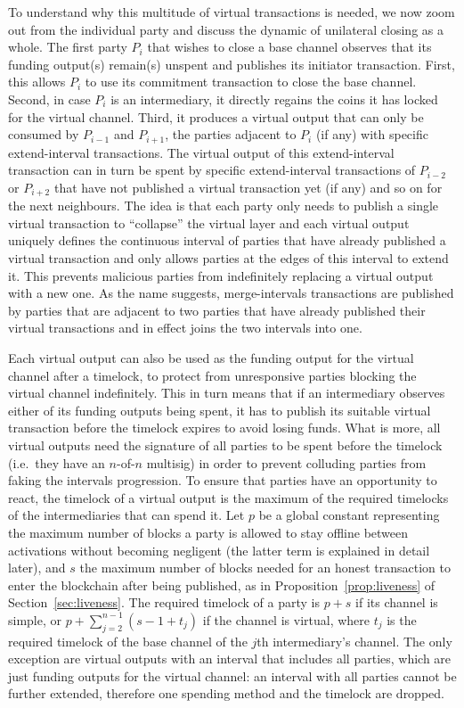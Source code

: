   To understand why this multitude of virtual transactions is needed, we now
  zoom out from the individual party and discuss the dynamic of unilateral
  closing as a
  whole. The first party $P_i$ that wishes to close a base channel observes that
  its funding output(s) remain(s) unspent and publishes its initiator
  transaction. First, this allows $P_i$ to use its commitment transaction to
  close the base channel. Second, in case $P_i$ is an intermediary, it directly
  regains the coins it has locked for the virtual channel. Third, it produces a
  virtual output that can only be consumed by $P_{i-1}$ and $P_{i+1}$, the
  parties adjacent to $P_i$ (if any) with specific extend-interval transactions.
  The virtual output of this extend-interval transaction can in turn be spent by
  specific extend-interval transactions of $P_{i-2}$ or $P_{i+2}$ that have not
  published a virtual transaction yet (if any) and so on for the next neighbours. The
  idea is that each party only needs to publish a single virtual transaction to
  ``collapse'' the virtual layer and each virtual output uniquely defines the
  continuous interval of parties that have already published a virtual
  transaction and only allows parties at the edges of this interval to extend it.
  This prevents malicious parties from indefinitely replacing a virtual output
  with a new one. As the name suggests, merge-intervals transactions are
  published by parties that are adjacent to two parties that have already
  published their virtual transactions and in effect joins the two intervals into
  one.

  Each virtual output can also be used as the funding output for the virtual
  channel after a timelock, to protect from unresponsive parties blocking the
  virtual channel indefinitely. This in turn means that if an intermediary
  observes either of its funding outputs being spent, it has to publish its
  suitable virtual transaction before the timelock expires to avoid losing
  funds. What is more, all virtual outputs need the signature of all parties to
  be spent before the timelock (i.e.\ they have an $n$-of-$n$ multisig) in order
  to prevent colluding parties from faking the intervals progression. To ensure
  that parties have an opportunity to react, the timelock of a virtual output is
  the maximum of the required timelocks of the intermediaries that can spend it.
  Let $p$ be a global constant representing the maximum number of blocks a party
  is allowed to stay offline between activations without becoming negligent
  (the latter term is explained in detail later), and
  $s$ the maximum number of blocks needed for an honest transaction to enter the
  blockchain after being published, as in Proposition~\ref{prop:liveness} of
  Section~\ref{sec:liveness}.
  The required timelock of a party is $p + s$ if its channel is simple,  or $p +
  \sum\limits_{j = 2}^{n - 1}(s - 1 + t_j)$ if the channel is virtual, where
  $t_j$ is the required timelock of the base channel
  of the $j$th intermediary's channel. The only exception are virtual outputs
  with an interval that includes all parties, which are just
  funding outputs for the virtual channel: an interval with all parties cannot
  be further extended, therefore one spending method and the timelock are
  dropped.


